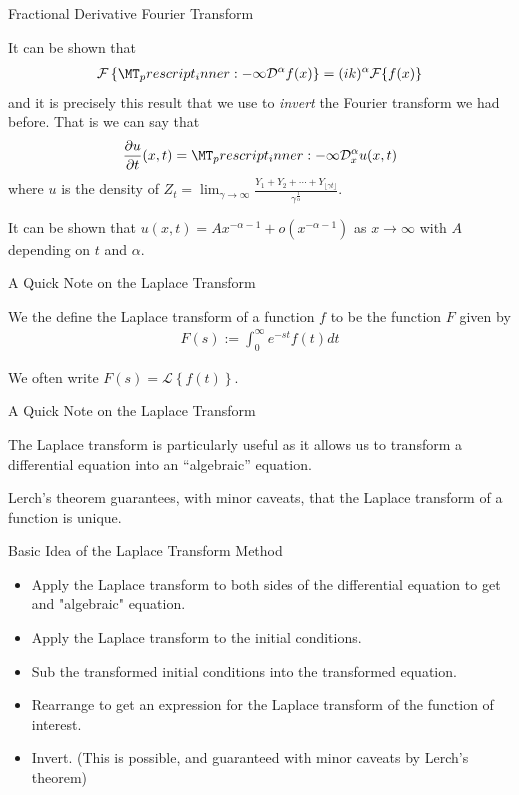 \documentclass[pdf]{beamer}
\newcommand{\lra}{\longrightarrow}
\newcommand{\laplace}[1]{ \mathcal{L} \left\{ #1 \right\} }
\begin{document}
\begin{frame}{Fractional Derivative Fourier Transform}

	It can be shown that
	\begin{align}
	    \mathcal{F}\left\{\prescript{}{-\infty}{\mathcal{D}^\alpha}f(x) \right\} = (ik)^\alpha \mathcal{F}\{ f(x) \}
    \end{align}
    and it is precisely this result that we use to \emph{invert} the Fourier transform we had before.
    That is we can say that
    \begin{align}
        \frac{\partial u}{\partial t}(x,t) = \prescript{}{-\infty}{\mathcal{D}^\alpha_x} u(x,t)
    \end{align}
    where $u $ is the density of $ Z_t = \lim_{\gamma\lra\infty} \frac{Y_1 + Y_2 + \cdots + Y_{\lfloor \gamma t \rfloor}}{\gamma^\frac{1}{\alpha}} $.
    
    It can be shown that $ u(x,t) = Ax^{-\alpha-1} + o(x^{-\alpha-1}) $ as $ x \lra \infty $ with $ A $ depending on $ t $ and $ \alpha $.
\end{frame}

\begin{frame}{A Quick Note on the Laplace Transform}
	\begin{definition}
		We the define the Laplace transform of a function $ f $ to be the function $ F $
		given by
		\begin{align*}
			F(s) := \int_0^\infty e^{-st} f(t) dt
		\end{align*}
	\end{definition}
	
	We often write $ F(s) = \laplace{f(t)} $.
	
\end{frame}

\begin{frame}{A Quick Note on the Laplace Transform}
	
		
	
	The Laplace transform is particularly useful as it allows us to transform a differential equation into
	an ``algebraic'' equation. 
	
	Lerch's theorem guarantees, with minor caveats, that the Laplace transform of a function is
	unique.
	
\end{frame}

\begin{frame}{Basic Idea of the Laplace Transform Method}
	\begin{itemize}
		\item Apply the Laplace transform to both sides of the differential equation to get
		and "algebraic" equation.
		\item Apply the Laplace transform to the initial conditions. 
		\item Sub the transformed initial conditions into the transformed equation.
		\item Rearrange to get an expression for the Laplace transform of the function of interest.
		\item Invert. (This is possible, and guaranteed with minor caveats by Lerch's theorem)
	\end{itemize}
\end{frame}
\end{document}
